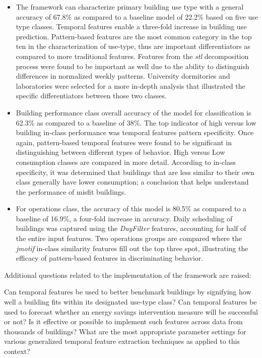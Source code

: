 \begin{itemize}
\item The framework can characterize primary building use type with a general accuracy of 67.8\% as compared to a baseline model of 22.2\% based on five use type classes. Temporal features enable a three-fold increase in building use prediction. Pattern-based features are the most common category in the top ten in the characterization of use-type, thus are important differentiators as compared to more traditional features. Features from the \emph{stl} decomposition process were found to be important as well due to the ability to distinguish differences in normalized weekly patterns. University dormitories and laboratories were selected for a more in-depth analysis that illustrated the specific differentiators between those two classes. 
\item Building performance class overall accuracy of the model for classification is 62.3\% as compared to a baseline of 38\%. The top indicator of high versus low building in-class performance was temporal features pattern specificity. Once again, pattern-based temporal features were found to be significant in distinguishing between different types of behavior. High versus Low consumption classes are compared in more detail. According to in-class specificity, it was determined that buildings that are less similar to their own class generally have lower consumption; a conclusion that helps understand the performance of misfit buildings.
\item For operations class, the accuracy of this model is 80.5\% as compared to a baseline of 16.9\%, a four-fold increase in accuracy. Daily scheduling of buildings was captured using the \emph{DayFilter} features, accounting for half of the entire input features. Two operations groups are compared where the \emph{jmotif} in-class similarity features fill out the top three spot, illustrating the efficacy of pattern-based features in discriminating behavior. 
\end{itemize}

Additional questions related to the implementation of the framework are raised:
\begin{center}
Can temporal features be used to better benchmark buildings by signifying how well a building fits within its designated use-type class? Can temporal features be used to forecast whether an energy savings intervention measure will be successful or not? Is it effective or possible to implement such features across data from thousands of buildings? What are the most appropriate parameter settings for various generalized temporal feature extraction techniques as applied to this context?
\end{center}

